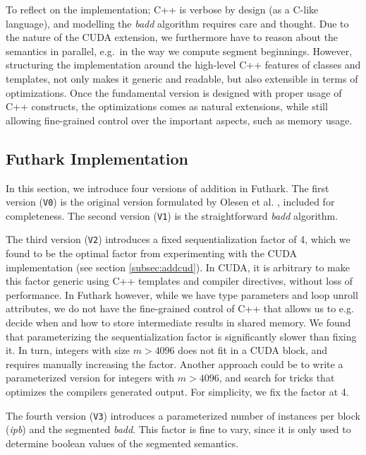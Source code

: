 To reflect on the implementation; C++ is verbose by design (as a C-like
language), and modelling the \textit{badd} algorithm requires care and
thought. Due to the nature of the CUDA extension, we furthermore have to reason
about the semantics in parallel, e.g.\ in the way we compute segment
beginnings. However, structuring the implementation around the high-level C++
features of classes and templates, not only makes it generic and readable, but
also extensible in terms of optimizations. Once the fundamental version is
designed with proper usage of C++ constructs, the optimizations comes as natural
extensions, while still allowing fine-grained control over the important
aspects, such as memory usage.

\subsection{Futhark Implementation}
\label{subsec:addfut}

In this section, we introduce four versions of addition in Futhark. The first
version (\texttt{V0}) is the original version formulated by Olesen et
al. \cite{DPPproject}, included for completeness. The second version
(\texttt{V1}) is the straightforward \textit{badd} algorithm.

The third version (\texttt{V2}) introduces a fixed sequentialization factor of
4, which we found to be the optimal factor from experimenting with the CUDA
implementation (see section \ref{subsec:addcud}). In CUDA, it is arbitrary to
make this factor generic using C++ templates and compiler directives, without
loss of performance. In Futhark however, while we have type parameters and loop
unroll attributes, we do not have the fine-grained control of C++ that allows us
to e.g. decide when and how to store intermediate results in shared memory. We
found that parameterizing the sequentialization factor is significantly slower
than fixing it. In turn, integers with size $m>4096$ does not fit in a CUDA
block, and requires manually increasing the factor. Another approach could be to
write a parameterized version for integers with $m>4096$, and search for tricks
that optimizes the compilers generated output. For simplicity, we fix the factor
at 4.

The fourth version (\texttt{V3}) introduces a parameterized number of instances
per block (\textit{ipb}) and the segmented \textit{badd}. This factor is fine to
vary, since it is only used to determine boolean values of the segmented
semantics.

